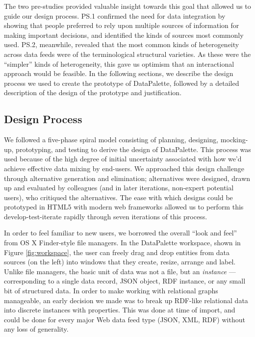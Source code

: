 \documentclass{sigchi}
\begin{document}
The two pre-studies provided valuable insight towards this goal that allowed us to guide our design process. PS.1 confirmed the need for data integration by showing that people preferred to rely upon multiple sources of information for making important decisions, and identified the kinds of sources most commonly used.  PS.2, meanwhile, revealed that the most common kinds of heterogeneity across data feeds were of the terminological structural varieties. As these were the ``simpler'' kinds of heterogeneity, this gave us optimism that an interactional approach would be feasible.  In the following sections, we describe the design process we used to create the prototype of DataPalette, followed by a detailed description of the design of the prototype and justification.

\subsection{Design Process}
We followed a five-phase spiral model consisting of planning, designing, mocking-up, prototyping, and testing to derive the design of DataPalette.  This process was used because of the high degree of initial uncertainty associated with how we'd achieve effective data mixing by end-users. We approached this design challenge through alternative generation and elimination; alternatives were designed, drawn up and evaluated by colleagues (and in later iterations, non-expert potential users), who critiqued the alternatives. The ease with which designs could be prototyped in HTML5 with modern web frameworks allowed us to perform this develop-test-iterate rapidly through seven iterations of this process.

In order to feel familiar to new users, we borrowed the overall  ``look and feel'' from OS X Finder-style file managers.  In the DataPalette workspace, shown in Figure \ref{fig:workspace}, the user can freely drag and drop entities from data sources (on the left) into windows that they create, resize, arrange and label. Unlike file managers, the basic unit of data was not a file, but an \emph{instance} --- corresponding to a single data record, JSON object, RDF instance, or any small bit of structured data. In order to make working with relational graphs manageable, an early decision we made was to break up RDF-like relational data into discrete instances with properties. This was done at time of import, and could be done for every major Web data feed type (JSON, XML, RDF) without any loss of generality.
\end{document}
